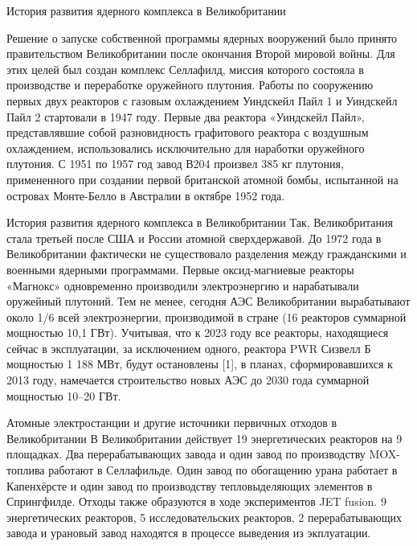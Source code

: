 \documentclass{beamer}
\begin{document}
\begin{frame}{История развития ядерного комплекса в Великобритании
}

Решение о запуске собственной программы ядерных вооружений было принято правительством Великобритании после окончания Второй мировой войны. Для этих целей был создан комплекс Селлафилд, миссия которого состояла в производстве и переработке оружейного плутония. 
Работы по сооружению первых двух реакторов с газовым охлаждением Уиндскейл Пайл 1 и Уиндскейл Пайл 2 стартовали в 1947 году. Первые два реактора «Уиндскейл Пайл», представлявшие собой разновидность графитового реактора с воздушным охлаждением, использовались исключительно для наработки оружейного плутония.
С 1951 по 1957 год завод В204 произвел 385 кг плутония, примененного при создании первой британской атомной бомбы, испытанной на островах Монте-Белло в Австралии в октябре 1952 года. 
\end{frame}

\begin{frame}{История развития ядерного комплекса в Великобритании}
    Так, Великобритания стала третьей после США и России атомной сверхдержавой.
До 1972 года в Великобритании фактически не существовало разделения между гражданскими и военными ядерными программами. Первые оксид-магниевые реакторы «Магнокс» одновременно производили электроэнергию и нарабатывали оружейный плутоний. 
Тем не менее, сегодня АЭС Великобритании вырабатывают около 1/6 всей электроэнергии, производимой в стране (16 реакторов суммарной мощностью 10,1 ГВт).
Учитывая, что к 2023 году все реакторы, находящиеся сейчас в эксплуатации, за исключением одного, реактора PWR Сизвелл Б мощностью 1 188 МВт, будут остановлены [1], в планах, сформировавшихся к 2013 году, намечается строительство новых АЭС до 2030 года суммарной мощностью 10–20 ГВт. 
\end{frame}


\begin{frame}{Атомные электростанции и другие источники первичных отходов в Великобритании}
В Великобритании действует 19 энергетических реакторов на 9 площадках. Два перерабатывающих завода и один завод по производству MOX-топлива работают в Селлафильде. Один завод по обогащению урана работает в Капенхёрсте и один завод по производству тепловыделяющих элементов в Спрингфилде. Отходы также образуются в ходе экспериментов JET fusion. 9 энергетических реакторов, 5 исследовательских реакторов, 2 перерабатывающих завода и урановый завод находятся в процессе выведения из экплуатации.


\end{frame}
\end{document}
